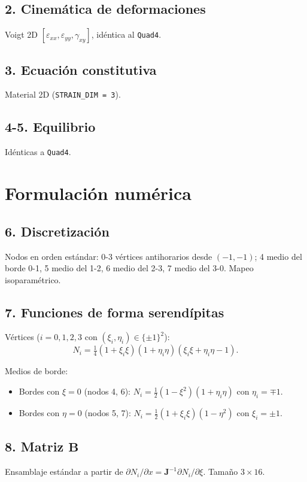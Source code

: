 \documentclass[11pt,letterpaper,oneside]{report}
\begin{document}
\subsection{2. Cinemática de deformaciones}
Voigt 2D $[\varepsilon_{xx}, \varepsilon_{yy}, \gamma_{xy}]$, idéntica al \texttt{Quad4}.

\subsection{3. Ecuación constitutiva}
Material 2D (\texttt{STRAIN\_DIM = 3}).

\subsection{4-5. Equilibrio}
Idénticas a \texttt{Quad4}.


\section{Formulación numérica}

\subsection{6. Discretización}
Nodos en orden estándar: 0-3 vértices antihorarios desde $(-1, -1)$; 4 medio del borde 0-1, 5 medio del 1-2, 6 medio del 2-3, 7 medio del 3-0. Mapeo isoparamétrico.

\subsection{7. Funciones de forma serendípitas}
Vértices ($i = 0, 1, 2, 3$ con $(\xi_i, \eta_i) \in \{\pm 1\}^2$):
\[
N_i = \tfrac{1}{4}(1 + \xi_i\xi)(1 + \eta_i\eta)(\xi_i\xi + \eta_i\eta - 1).
\]

Medios de borde:
\begin{itemize}
  \item Bordes con $\xi = 0$ (nodos 4, 6): $N_i = \tfrac{1}{2}(1 - \xi^2)(1 + \eta_i\eta)$ con $\eta_i = \mp 1$.
  \item Bordes con $\eta = 0$ (nodos 5, 7): $N_i = \tfrac{1}{2}(1 + \xi_i\xi)(1 - \eta^2)$ con $\xi_i = \pm 1$.
\end{itemize}

\subsection{8. Matriz $\mathbf B$}
Ensamblaje estándar a partir de $\partial N_i / \partial x = \mathbf J^{-1} \partial N_i / \partial \xi$. Tamaño $3 \times 16$.
\end{document}
